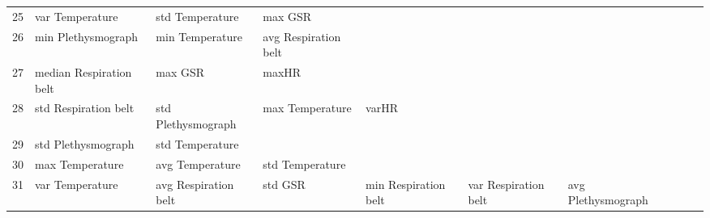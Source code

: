 \begin{landscape}
\begin{table}[]
\begin{tabular}{l|llllllll}
25       & var Temperature         & std Temperature         & max GSR                 &                         &                         &                       &                         &                         &                         &         \\
26       & min Plethysmograph      & min Temperature         & avg Respiration belt    &                         &                         &                       &                         &                         &                         &         \\
27       & median Respiration belt & max GSR                 & maxHR                   &                         &                         &                       &                         &                         &                         &         \\
28       & std Respiration belt    & std Plethysmograph      & max Temperature         & varHR                   &                         &                       &                         &                         &                         &         \\
29       & std Plethysmograph      & std Temperature         &                         &                         &                         &                       &                         &                         &                         &         \\
30       & max Temperature         & avg Temperature         & std Temperature         &                         &                         &                       &                         &                         &                         &         \\
31       & var Temperature         & avg Respiration belt    & std GSR                 & min Respiration belt    & var Respiration belt    & avg Plethysmograph    &                         &                         &                         &         \\
\end{tabular}
\end{table}
\end{landscape}
\clearpage
